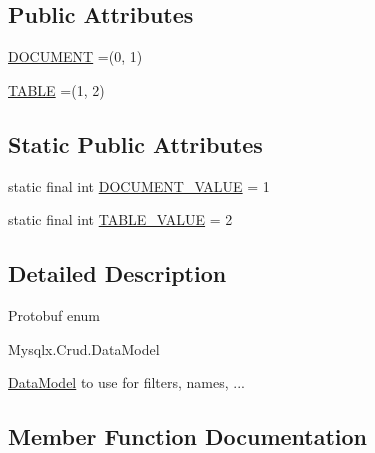 \subsection*{Public Attributes}
\begin{DoxyCompactItemize}
\item 
\mbox{\hyperlink{enumcom_1_1mysql_1_1cj_1_1x_1_1protobuf_1_1_mysqlx_crud_1_1_data_model_ae7a3238c10f1593f2b0f364281316b37}{D\+O\+C\+U\+M\+E\+NT}} =(0, 1)
\item 
\mbox{\hyperlink{enumcom_1_1mysql_1_1cj_1_1x_1_1protobuf_1_1_mysqlx_crud_1_1_data_model_ad95cdc4e7a6cdab7a79917719c92de93}{T\+A\+B\+LE}} =(1, 2)
\end{DoxyCompactItemize}
\subsection*{Static Public Attributes}
\begin{DoxyCompactItemize}
\item 
static final int \mbox{\hyperlink{enumcom_1_1mysql_1_1cj_1_1x_1_1protobuf_1_1_mysqlx_crud_1_1_data_model_a331cafa358eb0c55a7b3a46b3032e568}{D\+O\+C\+U\+M\+E\+N\+T\+\_\+\+V\+A\+L\+UE}} = 1
\item 
static final int \mbox{\hyperlink{enumcom_1_1mysql_1_1cj_1_1x_1_1protobuf_1_1_mysqlx_crud_1_1_data_model_ae5fdd8346e00f9cd984eae15087e82c6}{T\+A\+B\+L\+E\+\_\+\+V\+A\+L\+UE}} = 2
\end{DoxyCompactItemize}


\subsection{Detailed Description}
Protobuf enum
\begin{DoxyCode}
Mysqlx.Crud.DataModel 
\end{DoxyCode}



\begin{DoxyPre}
\mbox{\hyperlink{enumcom_1_1mysql_1_1cj_1_1x_1_1protobuf_1_1_mysqlx_crud_1_1_data_model}{DataModel}} to use for filters, names, ...
\end{DoxyPre}
 

\subsection{Member Function Documentation}
\mbox{\label{enumcom_1_1mysql_1_1cj_1_1x_1_1protobuf_1_1_mysqlx_crud_1_1_data_model_a54ba897915bc10ff7d5467c89f6b3cf9}} 
